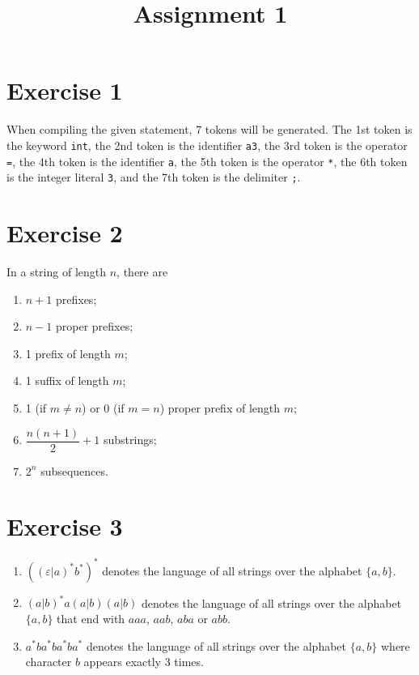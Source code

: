 \documentclass{CompilerAssignment}
\title{Assignment 1}
\begin{document}
\maketitle
\section{Exercise 1}

When compiling the given statement,
7 tokens will be generated.
The 1st token is the keyword \verb|int|,
the 2nd token is the identifier \verb|a3|,
the 3rd token is the operator \verb|=|,
the 4th token is the identifier \verb|a|,
the 5th token is the operator \verb|*|,
the 6th token is the integer literal \verb|3|,
and the 7th token is the delimiter \verb|;|.

\section{Exercise 2}

In a string of length $n$, there are

\begin{enumerate}
    \item $n+1$ prefixes;
    \item $n-1$ proper prefixes;
    \item 1 prefix of length $m$;
    \item 1 suffix of length $m$;
    \item 1 (if $m \neq n$) or 0 (if $m = n$) proper prefix of length $m$;
    \item $\dfrac{n(n+1)}{2}+1$ substrings;
    \item $2^n$ subsequences.
\end{enumerate}

\section{Exercise 3}

\begin{enumerate}
    \item $\left(\left(\varepsilon|a\right)^*b^*\right)^*$ denotes the language of all strings over the alphabet $\{a, b\}$.
    \item $\left(a|b\right)^*a\left(a|b\right)\left(a|b\right)$ denotes the language of all strings over the alphabet $\{a, b\}$ that end with $aaa$, $aab$, $aba$ or $abb$.
    \item $a^*ba^*ba^*ba^*$ denotes the language of all strings over the alphabet $\{a, b\}$ where character $b$ appears exactly 3 times.
\end{enumerate}
\end{document}
